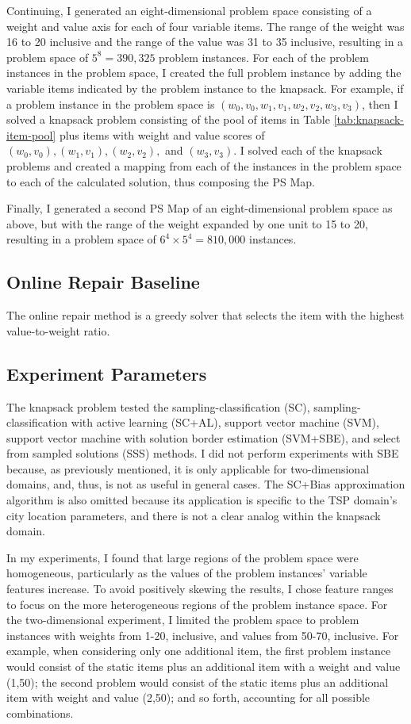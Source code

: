 Continuing, I generated an eight-dimensional problem space consisting of a weight and value axis for each of four variable items.  The range of the weight was 16 to 20 inclusive and the range of the value was 31 to 35 inclusive, resulting in a problem space of $5^8 = 390,325$ problem instances.  For each of the problem instances in the problem space, I created the full problem instance by adding the variable items indicated by the problem instance to the knapsack.  For example, if a problem instance in the problem space is $(w_0,v_0,w_1,v_1,w_2,v_2,w_3,v_3)$, then I solved a knapsack problem consisting of the pool of items in Table \ref{tab:knapsack-item-pool} plus items with weight and value scores of $(w_0,v_0),(w_1,v_1),(w_2,v_2),$ and $(w_3,v_3)$.  I solved each of the knapsack problems and created a mapping from each of the instances in the problem space to each of the calculated solution, thus composing the PS Map.

Finally, I generated a second PS Map of an eight-dimensional problem space as above, but with the range of the weight expanded by one unit to 15 to 20, resulting in a problem space of $6^4 \times 5^4 = 810,000$ instances.



\subsection{Online Repair Baseline}  The online repair method is a greedy solver that selects the item with the highest value-to-weight ratio.


\subsection{Experiment Parameters}

The knapsack problem tested the sampling-classification (SC), sampling-classification with active learning (SC+AL), support vector machine (SVM), support vector machine with solution border estimation (SVM+SBE), and select from sampled solutions (SSS) methods.  I did not perform experiments with SBE because, as previously mentioned, it is only applicable for two-dimensional domains, and, thus, is not as useful in general cases.  The SC+Bias approximation algorithm is also omitted because its application is specific to the TSP domain's city location parameters, and there is not a clear analog within the knapsack domain.

In my experiments, I found that large regions of the problem space were homogeneous, particularly as the values of the problem instances' variable features increase.  To avoid positively skewing the results, I chose feature ranges to focus on the more heterogeneous regions of the problem instance space.  For the two-dimensional experiment, I limited the problem space to problem instances with  weights from  1-20, inclusive, and values from 50-70, inclusive.  For example, when considering only one additional item, the first problem instance would consist of the static items plus an additional item with a weight and value (1,50); the second problem would consist of the static items plus an additional item with weight and value (2,50); and so forth, accounting for all possible combinations.

